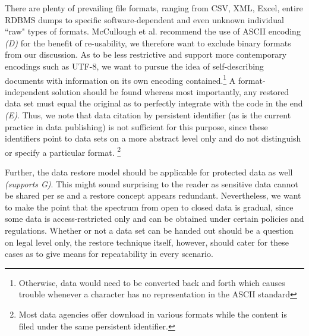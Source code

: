 \documentclass{sig-alternate}
\begin{document}
There are plenty of prevailing file formats, ranging from CSV, XML, Excel, entire RDBMS dumps to specific software-dependent and even unknown individual ``raw" types of formats.
McCullough et al. recommend the use of ASCII encoding \textit{(D)} for the benefit of re-usability, we therefore want to exclude binary formats from our discussion.
As to be less restrictive and support more contemporary encodings such as UTF-8, we want to pursue the idea of self-describing documents with information on its own encoding contained.\footnote{Otherwise, data would need to be converted back and forth which causes trouble whenever a character has no representation in the ASCII standard}
A format-independent solution should be found whereas most importantly, any restored data set must equal the original as to perfectly integrate with the code in the end \textit{(E)}. 
Thus, we note that data citation by persistent identifier (as is the current practice in data publishing) is not sufficient for this purpose, since these identifiers point to data sets on a more abstract level only and do not distinguish or specify a particular format.
\footnote{Most data agencies offer download in various formats while the content is filed under the same persistent identifier.}

  
Further, the data restore model should be applicable for protected data as well \textit{(supports G)}.
This might sound surprising to the reader as sensitive data cannot be shared per se and a restore concept appears redundant.
Nevertheless, we want to make the point that the spectrum from open to closed data is gradual, since some data is access-restricted only and can be obtained under certain policies and regulations.
Whether or not a data set can be handed out should be a question on legal level only, the restore technique itself, however, should cater for these cases as to give means for repeatability in every scenario.
\end{document}
